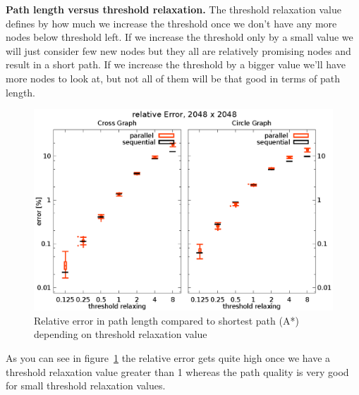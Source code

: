 \documentclass[letterpaper]{article}
\newcommand{\mypar}[1]{{\bf #1.}}
\begin{document}
\mypar{Path length versus threshold relaxation}
The threshold relaxation value defines by how much we increase the threshold once we don't have any more nodes below threshold left. If we increase the threshold only by a small value we will just consider few new nodes but they all are relatively promising nodes and result in a short path. If we increase the threshold by a bigger value we'll have more nodes to look at, but not all of them will be that good in terms of path length.
\begin{figure}[h]\centering
  \includegraphics[scale=0.558]{error_threshold.eps}
  \caption{Relative error in path length compared to shortest path (A*) depending on threshold relaxation value\label{fig:error_thresh}}
\end{figure}
As you can see in figure~\ref{fig:error_thresh} the relative error gets quite high once we have a threshold relaxation value greater than 1 whereas the path quality is very good for small threshold relaxation values.
\end{document}
